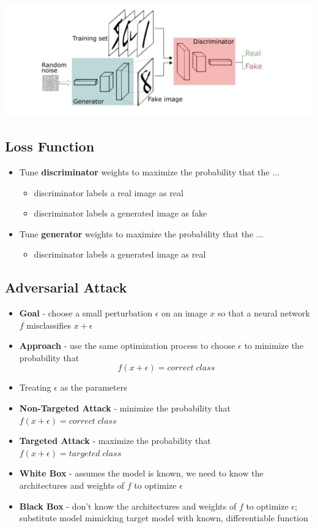 \documentclass[11pt]{article}
\begin{document}
\begin{center}
\includegraphics[scale=0.9]{images/gan.png}
\end{center}

\subsection{Loss Function}
\begin{itemize}
\item Tune \textbf{discriminator} weights to maximize the probability that the ...
\begin{itemize}
\item discriminator labels a real image as real
\item discriminator labels a generated image as fake
\end{itemize}
\item Tune \textbf{generator} weights to maximize the probability that the ...
\begin{itemize}
\item discriminator labels a generated image as real
\end{itemize}
\end{itemize}

\subsection{Adversarial Attack}
\begin{itemize}
\item \textbf{Goal} - choose a small perturbation $\epsilon$ on an image $x$ so that a neural network $f$ misclassifies $x+ \epsilon$
\item \textbf{Approach} - use the same optimization process to choose $\epsilon$ to minimize the probability that
$$ f(x+ \epsilon ) = correct \; class $$
\item Treating $\epsilon$ as the parameters
\item \textbf{Non-Targeted Attack} - minimize the probability that $ f(x+ \epsilon ) = correct \; class $
\item \textbf{Targeted Attack} - maximize the probability that $ f(x+ \epsilon ) = targeted \; class $
\item \textbf{White Box} - assumes the model is known,  we need to know the architectures and weights of $f$ to optimize $\epsilon$
\item \textbf{Black Box} - don’t know the architectures and weights of $f$ to optimize $\epsilon$; substitute model mimicking target model with known,  differentiable function
\end{itemize}
\end{document}
